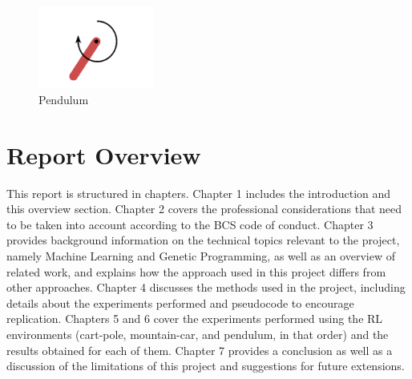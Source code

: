 \begin{figure}[H]
    \centering
    \includegraphics[width=3.8cm]{images/pendulum}
    \caption{Pendulum}
    \label{fig:pendulum}
\end{figure}


\section{Report Overview}
This report is structured in chapters. Chapter 1 includes the introduction and this overview section. Chapter 2 covers the professional considerations that need to be taken into account according to the BCS code of conduct. Chapter 3 provides background information on the technical topics relevant to the project, namely Machine Learning and Genetic Programming, as well as an overview of related work, and explains how the approach used in this project differs from other approaches. Chapter 4 discusses the methods used in the project, including details about the experiments performed and pseudocode to encourage replication. Chapters 5 and 6 cover the experiments performed using the RL environments (cart-pole, mountain-car, and pendulum, in that order) and the results obtained for each of them. Chapter 7 provides a conclusion as well as a discussion of the limitations of this project and suggestions for future extensions.
